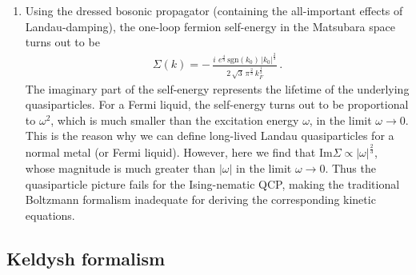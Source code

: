 \documentclass[aps, prb, onecolumn, nofootinbib, citeautoscript, 10pt]{revtex4-2}
\begin{document}
\begin{enumerate}[leftmargin=*]
\item Using the dressed bosonic propagator (containing the all-important effects of Landau-damping), the one-loop fermion self-energy in the Matsubara space turns out to be 
\begin{align}
	\Sigma(k)= -\, \frac{   i \, \,   e^{\frac{4} {3}}\, \text{sgn}(k_0) \, |k_0|^{ \frac{2} {3} }}
	{2 \, \sqrt{3}\, \pi^{ \frac{2} {3} }\,k_F^{\frac{1} {2}}} \,.
	\label{selfenergyform}
\end{align}
The imaginary part of the self-energy represents the lifetime of the underlying quasiparticles. For a Fermi liquid, the self-energy turns out to be proportional to $\omega^2$, which is much smaller than the excitation energy $\omega$, in the limit $\omega \rightarrow 0 $. This is the reason why we can define long-lived Landau quasiparticles for a normal metal (or Fermi liquid). However, here we find that $\text{Im}\Sigma \propto |\omega|^{ \frac{2} {3} }$, whose magnitude is much greater than $|\omega|$ in the limit $\omega \rightarrow 0$. Thus the quasiparticle picture fails for the Ising-nematic QCP, making the traditional Boltzmann formalism inadequate for deriving the corresponding kinetic equations. 
	
\end{enumerate}


\subsection{Keldysh formalism}
\label{seckeldysh}
\end{document}
